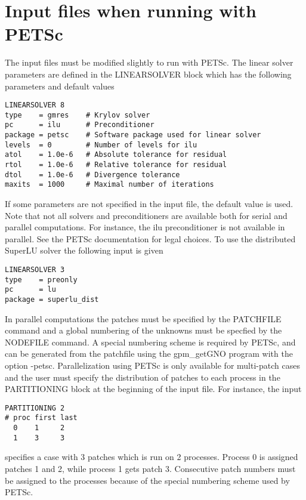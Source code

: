 \documentclass[a4wide,11pt]{article}
\begin{document}
\section{Input files when running with PETSc}
The input files must be modified slightly to run with PETSc. The
linear solver parameters are defined in the \textsf{LINEARSOLVER}
block which has the following parameters and default values
\begin{verbatim}
LINEARSOLVER 8
type    = gmres    # Krylov solver
pc      = ilu      # Preconditioner
package = petsc    # Software package used for linear solver
levels  = 0        # Number of levels for ilu
atol    = 1.0e-6   # Absolute tolerance for residual
rtol    = 1.0e-6   # Relative tolerance for residual
dtol    = 1.0e-6   # Divergence tolerance
maxits  = 1000     # Maximal number of iterations
\end{verbatim}
If some parameters are not specified in the input file, the default
value is used. Note that not all solvers and preconditioners are
available both for serial and parallel computations. For instance, the
\textsf{ilu} preconditioner is not available in parallel. See the
PETSc documentation for legal choices. To use the distributed SuperLU 
solver the following input is given
\begin{verbatim}
LINEARSOLVER 3
type    = preonly
pc      = lu
package = superlu_dist
\end{verbatim}
In parallel computations the patches must be specified by the 
\textsf{PATCHFILE} command and a global numbering of the unknowns
must be specfied by the \textsf{NODEFILE} command. A special
numbering scheme is required by PETSc, and can be generated
from the patchfile using the \textsf{gpm\_getGNO} program with
the option \textsf{-petsc}. Parallelization using PETSc is only
available for multi-patch cases and the user must specify the
distribution of patches to each process in the \textsf{PARTITIONING}
block at the beginning of the input file. For instance, the input
\begin{verbatim}
PARTITIONING 2
# proc first last
  0    1     2
  1    3     3
\end{verbatim}
specifies a case with 3 patches which is run on 2 processes. Process 0
is assigned patches 1 and 2, while process 1 gets patch 3. Consecutive
patch numbers must be assigned to the processes because of the special 
numbering scheme used by PETSc.
\end{document}
